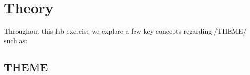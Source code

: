 
\section{Theory}\label{sec:theory}
    Throughout this lab exercise we explore a few key concepts regarding /THEME/ such as:

    \subsection{THEME}\label{subsec:theme}
        \lipsum[1]
